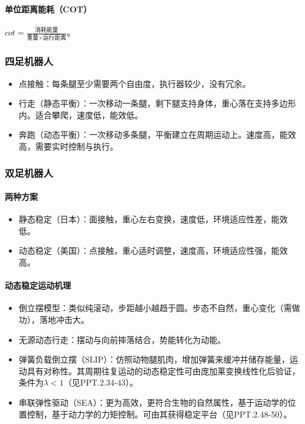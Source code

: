 \documentclass[
12pt, %
a4paper, 
oneside, %
headinclude,footinclude, %
]{scrartcl}
\begin{document}
\paragraph{单位距离能耗（COT）}
$ cot = \frac{\text{消耗能量}}{\text{重量} \times \text{运行距离}} $。
\subsubsection{四足机器人}
\begin{itemize}
\item 点接触：每条腿至少需要两个自由度，执行器较少，没有冗余。
\item 行走（静态平衡）：一次移动一条腿，剩下腿支持身体，重心落在支持多边形内。适合攀爬，速度低，能效低。
\item 奔跑（动态平衡）：一次移动多条腿，平衡建立在周期运动上。速度高，能效高，需要实时控制与执行。
\end{itemize}
\subsubsection{双足机器人}
\paragraph{两种方案}
\begin{itemize}
\item 静态稳定（日本）：面接触，重心左右变换，速度低，环境适应性差，能效低。
\item 动态稳定（美国）：点接触，重心适时调整，速度高，环境适应性强，能效高。
\end{itemize}
\paragraph{动态稳定运动机理}
\begin{itemize}
\item 倒立摆模型：类似纯滚动，步距越小越趋于圆。步态不自然，重心变化（需做功），落地冲击大。
\item 无源动态行走：摆动与向前摔落结合，势能转化为动能。
\item 弹簧负载倒立摆（SLIP）：仿照动物腿肌肉，增加弹簧来缓冲并储存能量，运动具有对称性。其周期往复运动的动态稳定性可由庞加莱变换线性化后验证，条件为$ \lambda < 1 $（见PPT.2.34-43）。
\item 串联弹性驱动（SEA）：更为高效，更符合生物的自然属性，基于运动学的位置控制，基于动力学的力矩控制。可由其获得稳定平台（见PPT.2.48-50）。
\end{itemize}
\end{document}
